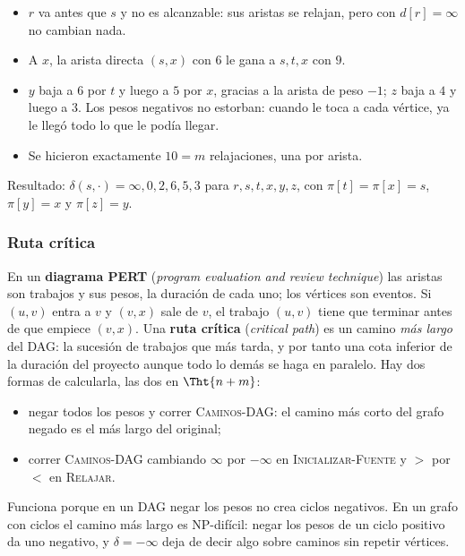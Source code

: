 \documentclass[11pt,letterpaper]{article}
\begin{document}
\begin{ejemplo}
  \begin{itemize}[itemsep=0.1em]
    \item $r$ va antes que $s$ y no es alcanzable: sus aristas se
          relajan, pero con $d[r] = \infty$ no cambian nada.
    \item A $x$, la arista directa $(s, x)$ con $6$ le gana a
          $s, t, x$ con $9$.
    \item $y$ baja a $6$ por $t$ y luego a $5$ por $x$, gracias a la
          arista de peso $-1$; $z$ baja a $4$ y luego a $3$. Los pesos
          negativos no estorban: cuando le toca a cada vértice, ya le
          llegó todo lo que le podía llegar.
    \item Se hicieron exactamente $10 = m$ relajaciones, una por
          arista.
  \end{itemize}
  Resultado: $\delta(s, \cdot) = \infty, 0, 2, 6, 5, 3$ para
  $r, s, t, x, y, z$, con $\pi[t] = \pi[x] = s$, $\pi[y] = x$ y
  $\pi[z] = y$.
\end{ejemplo}

\subsubsection*{Ruta crítica}

En un \textbf{diagrama PERT} (\textit{program evaluation and review
technique}) las aristas son trabajos y sus pesos, la duración de cada
uno; los vértices son eventos. Si $(u, v)$ entra a $v$ y $(v, x)$ sale
de $v$, el trabajo $(u, v)$ tiene que terminar antes de que empiece
$(v, x)$. Una \textbf{ruta crítica} (\textit{critical path}) es un
camino \emph{más largo} del DAG: la sucesión de trabajos que más
tarda, y por tanto una cota inferior de la duración del proyecto
aunque todo lo demás se haga en paralelo. Hay dos formas de
calcularla, las dos en $\Tht{n + m}$:
\begin{itemize}[itemsep=0.1em]
  \item negar todos los pesos y correr \textsc{Caminos-DAG}: el
        camino más corto del grafo negado es el más largo del
        original;
  \item correr \textsc{Caminos-DAG} cambiando $\infty$ por $-\infty$
        en \textsc{Inicializar-Fuente} y $>$ por $<$ en
        \textsc{Relajar}.
\end{itemize}
Funciona porque en un DAG negar los pesos no crea ciclos negativos.
En un grafo con ciclos el camino más largo es NP-difícil: negar los
pesos de un ciclo positivo da uno negativo, y $\delta = -\infty$ deja
de decir algo sobre caminos sin repetir vértices.
\end{document}
